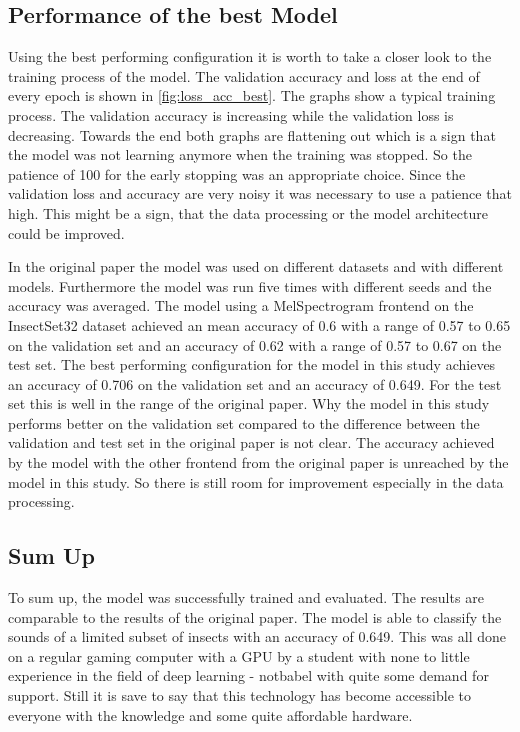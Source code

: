 \subsection{Performance of the best Model}%

Using the best performing configuration it is worth to take a closer look to the
training process of the model. The validation accuracy and loss at the end of
every epoch is shown in \autoref{fig:loss_acc_best}. The graphs show a typical
training process. The validation accuracy is increasing while the validation loss
is decreasing. Towards the end both graphs are flattening out which is a sign that
the model was not learning anymore when the training was stopped. So the patience
of 100 for the early stopping was an appropriate choice. Since the validation loss
and accuracy are very noisy it was necessary to use a patience that high. This might
be a sign, that the data processing or the model architecture could be improved.



In the original paper \autocite{faissAdaptiveRepresentationsSound2023}
the model was used on different datasets and with different models. Furthermore the model was
run five times with different seeds and the accuracy was averaged. The model using a MelSpectrogram
frontend on the InsectSet32 dataset achieved an mean accuracy of 0.6 with a range of 0.57 to 0.65
on the validation set and an accuracy of 0.62 with a range of 0.57 to 0.67 on the test set.
The best performing configuration for the model in this study achieves an accuracy of 0.706 on the validation set
and an accuracy of 0.649. For the test set this is well in the range of the original paper.
Why the model in this study performs better on the validation set compared to the difference
between the validation and test set in the original paper is not clear. The accuracy achieved
by the model with the other frontend from the original paper is unreached by the model in this study.
So there is still room for improvement especially in the data processing.

\subsection{Sum Up}%

To sum up, the model was successfully trained and evaluated. The results are comparable to the results
of the original paper. The model is able to classify the sounds of a limited subset of insects with an accuracy of 0.649.
This was all done on a regular gaming computer with a GPU by a student with none to little experience
in the field of deep learning - notbabel with quite some demand for support.
Still it is save to say that this technology has become accessible to everyone 
with the knowledge and some quite affordable hardware.
